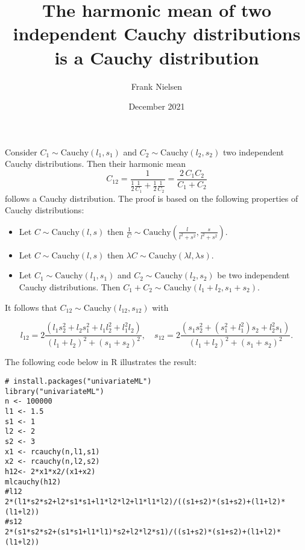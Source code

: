 \documentclass[11pt]{article}
\title{The harmonic mean of two independent Cauchy distributions is a Cauchy distribution}
\author{Frank Nielsen}
\date{December 2021}
\def\Cauchy{\mathrm{Cauchy}}
\begin{document}
\maketitle

Consider $C_1\sim\Cauchy(l_1,s_1)$ and $C_2\sim\Cauchy(l_2,s_2)$ two independent Cauchy distributions.
Then their harmonic mean 
$$
C_{12}=\frac{1}{\frac{1}{2}\frac{1}{C_1}+\frac{1}{2}\frac{1}{C_2}}=\frac{2\, C_1C_2}{C_1+C_2}
$$
follows a Cauchy distribution.
The proof is based on the following properties of Cauchy distributions:
\begin{itemize}
	\item Let $C\sim\Cauchy(l,s)$ then $\frac{1}{C}\sim\Cauchy\left(\frac{l}{l^2+s^2},\frac{s}{l^2+s^2}\right)$.
	
	\item Let $C\sim\Cauchy(l,s)$ then $\lambda C\sim\Cauchy(\lambda l,\lambda s)$.
	
	\item Let $C_1\sim\Cauchy(l_1,s_1)$ and $C_2\sim\Cauchy(l_2,s_2)$ be two independent Cauchy distributions.
Then $C_1+C_2\sim\Cauchy(l_1+l_2,s_1+s_2)$.
\end{itemize}

It follows that $C_{12}\sim\Cauchy(l_{12},s_{12})$ with

$$
l_{12}=2\frac{(l_1s_2^2+l_2s_1^2+l_1l_2^2+l_1^2l_2)}{(l_1+l_2)^2+(s_1+s_2)^2},
\quad
s_{12}=2\frac{(s_1s_2^2+(s_1^2+l_1^2)s_2+l_2^2s_1)}{(l_1+l_2)^2+(s_1+s_2)^2}.
$$

The following code below in R illustrates the result:
{\small
\begin{verbatim}
# install.packages("univariateML")
library("univariateML")
n <- 100000
l1 <- 1.5
s1 <- 1
l2 <- 2
s2 <- 3
x1 <- rcauchy(n,l1,s1)
x2 <- rcauchy(n,l2,s2)
h12<- 2*x1*x2/(x1+x2)
mlcauchy(h12)
#l12
2*(l1*s2*s2+l2*s1*s1+l1*l2*l2+l1*l1*l2)/((s1+s2)*(s1+s2)+(l1+l2)*(l1+l2))
#s12
2*(s1*s2*s2+(s1*s1+l1*l1)*s2+l2*l2*s1)/((s1+s2)*(s1+s2)+(l1+l2)*(l1+l2))
\end{verbatim}
}


 
%
%
\end{document}
